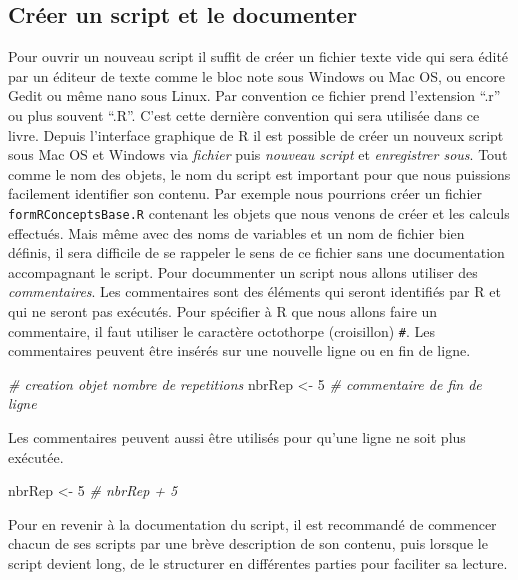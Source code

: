 \documentclass[]{book}
\newenvironment{Shaded}{\begin{snugshade}}{\end{snugshade}}
\newcommand{\DecValTok}[1]{\textcolor[rgb]{0.00,0.00,0.81}{#1}}
\newcommand{\StringTok}[1]{\textcolor[rgb]{0.31,0.60,0.02}{#1}}
\newcommand{\CommentTok}[1]{\textcolor[rgb]{0.56,0.35,0.01}{\textit{#1}}}
\newcommand{\NormalTok}[1]{#1}
\theoremstyle{definition}
\theoremstyle{definition}
\theoremstyle{definition}
\theoremstyle{remark}
\begin{document}
\subsection{Créer un script et le
documenter}\label{creer-un-script-et-le-documenter}

Pour ouvrir un nouveau script il suffit de créer un fichier texte vide
qui sera édité par un éditeur de texte comme le bloc note sous Windows
ou Mac OS, ou encore Gedit ou même nano sous Linux. Par convention ce
fichier prend l'extension ``.r'' ou plus souvent ``.R''. C'est cette
dernière convention qui sera utilisée dans ce livre. Depuis l'interface
graphique de R il est possible de créer un nouveux script sous Mac OS et
Windows via \emph{fichier} puis \emph{nouveau script} et
\emph{enregistrer sous}. Tout comme le nom des objets, le nom du script
est important pour que nous puissions facilement identifier son contenu.
Par exemple nous pourrions créer un fichier \texttt{formRConceptsBase.R}
contenant les objets que nous venons de créer et les calculs effectués.
Mais même avec des noms de variables et un nom de fichier bien définis,
il sera difficile de se rappeler le sens de ce fichier sans une
documentation accompagnant le script. Pour docummenter un script nous
allons utiliser des \emph{commentaires}. Les commentaires sont des
éléments qui seront identifiés par R et qui ne seront pas exécutés. Pour
spécifier à R que nous allons faire un commentaire, il faut utiliser le
caractère octothorpe (croisillon) \texttt{\#}. Les commentaires peuvent
être insérés sur une nouvelle ligne ou en fin de ligne.

\begin{Shaded}
\begin{Highlighting}[]
\CommentTok{# creation objet nombre de repetitions}
\NormalTok{nbrRep <-}\StringTok{ }\DecValTok{5} \CommentTok{# commentaire de fin de ligne}
\end{Highlighting}
\end{Shaded}

Les commentaires peuvent aussi être utilisés pour qu'une ligne ne soit
plus exécutée.

\begin{Shaded}
\begin{Highlighting}[]
\NormalTok{nbrRep <-}\StringTok{ }\DecValTok{5}
\CommentTok{# nbrRep + 5}
\end{Highlighting}
\end{Shaded}

Pour en revenir à la documentation du script, il est recommandé de
commencer chacun de ses scripts par une brève description de son
contenu, puis lorsque le script devient long, de le structurer en
différentes parties pour faciliter sa lecture.
\end{document}
